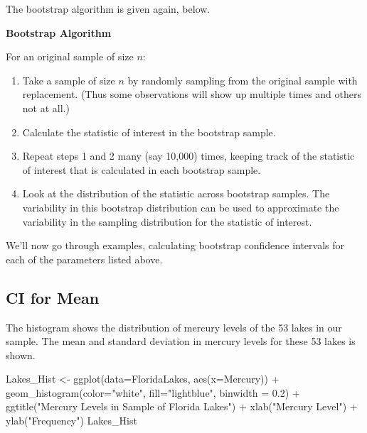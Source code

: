 \documentclass[
  letterpaper,
  DIV=11,
  numbers=noendperiod]{scrreprt}
\newenvironment{Shaded}{\begin{snugshade}}{\end{snugshade}}
\newcommand{\AttributeTok}[1]{\textcolor[rgb]{0.40,0.45,0.13}{#1}}
\newcommand{\FloatTok}[1]{\textcolor[rgb]{0.68,0.00,0.00}{#1}}
\newcommand{\FunctionTok}[1]{\textcolor[rgb]{0.28,0.35,0.67}{#1}}
\newcommand{\NormalTok}[1]{\textcolor[rgb]{0.00,0.23,0.31}{#1}}
\newcommand{\OtherTok}[1]{\textcolor[rgb]{0.00,0.23,0.31}{#1}}
\newcommand{\SpecialCharTok}[1]{\textcolor[rgb]{0.37,0.37,0.37}{#1}}
\newcommand{\StringTok}[1]{\textcolor[rgb]{0.13,0.47,0.30}{#1}}
\begin{document}
The bootstrap algorithm is given again, below.

\textbf{Bootstrap Algorithm}

For an original sample of size \(n\):

\begin{enumerate}
\def\labelenumi{\arabic{enumi}.}
\item
  Take a sample of size \(n\) by randomly sampling from the original
  sample with replacement. (Thus some observations will show up multiple
  times and others not at all.)
\item
  Calculate the statistic of interest in the bootstrap sample.
\item
  Repeat steps 1 and 2 many (say 10,000) times, keeping track of the
  statistic of interest that is calculated in each bootstrap sample.
\item
  Look at the distribution of the statistic across bootstrap samples.
  The variability in this bootstrap distribution can be used to
  approximate the variability in the sampling distribution for the
  statistic of interest.
\end{enumerate}

We'll now go through examples, calculating bootstrap confidence
intervals for each of the parameters listed above.

\subsection{CI for Mean}\label{ci-for-mean}

The histogram shows the distribution of mercury levels of the 53 lakes
in our sample. The mean and standard deviation in mercury levels for
these 53 lakes is shown.

\begin{Shaded}
\begin{Highlighting}[]
\NormalTok{Lakes\_Hist }\OtherTok{\textless{}{-}} \FunctionTok{ggplot}\NormalTok{(}\AttributeTok{data=}\NormalTok{FloridaLakes, }\FunctionTok{aes}\NormalTok{(}\AttributeTok{x=}\NormalTok{Mercury)) }\SpecialCharTok{+} 
  \FunctionTok{geom\_histogram}\NormalTok{(}\AttributeTok{color=}\StringTok{"white"}\NormalTok{, }\AttributeTok{fill=}\StringTok{"lightblue"}\NormalTok{, }\AttributeTok{binwidth =} \FloatTok{0.2}\NormalTok{) }\SpecialCharTok{+} 
  \FunctionTok{ggtitle}\NormalTok{(}\StringTok{"Mercury Levels in Sample of Florida Lakes"}\NormalTok{) }\SpecialCharTok{+} 
  \FunctionTok{xlab}\NormalTok{(}\StringTok{"Mercury Level"}\NormalTok{) }\SpecialCharTok{+} \FunctionTok{ylab}\NormalTok{(}\StringTok{"Frequency"}\NormalTok{) }
\NormalTok{Lakes\_Hist}
\end{Highlighting}
\end{Shaded}
\end{document}
